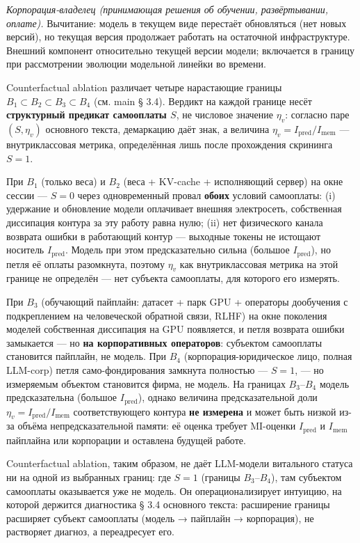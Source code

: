\documentclass[pdflatex,sn-mathphys-ay]{sn-jnl}
\begin{document}
\emph{Корпорация-владелец (принимающая решения об обучении, развёртывании, оплате).} Вычитание: модель в текущем виде перестаёт обновляться (нет новых версий), но текущая версия продолжает работать на остаточной инфраструктуре. Внешний компонент относительно текущей версии модели; включается в границу при рассмотрении эволюции модельной линейки во времени.

Counterfactual ablation различает четыре нарастающие границы \(B_1 \subset B_2 \subset B_3 \subset B_4\) (см. main § 3.4). Вердикт на каждой границе несёт \textbf{структурный предикат самооплаты \(S\)}, не числовое значение \(\eta_v\): согласно паре \((S, \eta_v)\) основного текста, демаркацию даёт знак, а величина \(\eta_v = I_{\text{pred}}/I_{\text{mem}}\) --- внутриклассовая метрика, определённая лишь после прохождения скрининга \(S = 1\).

При \(B_1\) (только веса) и \(B_2\) (веса + KV-cache + исполняющий сервер) на окне сессии --- \(S = 0\) через одновременный провал \textbf{обоих} условий самооплаты: (i) удержание и обновление модели оплачивает внешняя электросеть, собственная диссипация контура за эту работу равна нулю; (ii) нет физического канала возврата ошибки в работающий контур --- выходные токены не истощают носитель \(I_{\text{pred}}\). Модель при этом предсказательно сильна (большое \(I_{\text{pred}}\)), но петля её оплаты разомкнута, поэтому \(\eta_v\) как внутриклассовая метрика на этой границе не определён --- нет субъекта самооплаты, для которого его измерять.

При \(B_3\) (обучающий пайплайн: датасет + парк GPU + операторы дообучения с подкреплением на человеческой обратной связи, RLHF) на окне поколения моделей собственная диссипация на GPU появляется, и петля возврата ошибки замыкается --- но \textbf{на корпоративных операторов}: субъектом самооплаты становится пайплайн, не модель. При \(B_4\) (корпорация-юридическое лицо, полная LLM-corp) петля само-фондирования замкнута полностью --- \(S = 1\), --- но измеряемым объектом становится фирма, не модель. На границах \(B_3\)--\(B_4\) модель предсказательна (большое \(I_{\text{pred}}\)), однако величина предсказательной доли \(\eta_v = I_{\text{pred}}/I_{\text{mem}}\) соответствующего контура \textbf{не измерена} и может быть низкой из-за объёма непредсказательной памяти: её оценка требует MI-оценки \(I_{\text{pred}}\) и \(I_{\text{mem}}\) пайплайна или корпорации и оставлена будущей работе.

Counterfactual ablation, таким образом, не даёт LLM-модели витального статуса ни на одной из выбранных границ: где \(S = 1\) (границы \(B_3\)--\(B_4\)), там субъектом самооплаты оказывается уже не модель. Он операционализирует интуицию, на которой держится диагностика § 3.4 основного текста: расширение границы расширяет субъект самооплаты (модель → пайплайн → корпорация), не растворяет диагноз, а переадресует его.
\end{document}
